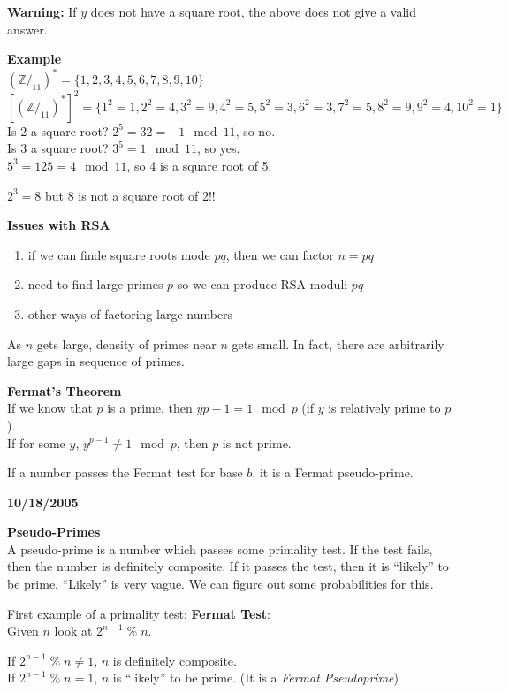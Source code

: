 \textbf{Warning:} If $y$ does not have a square root, the above does not give a valid answer.

\textbf{Example} \\
$(\mathbb{Z}/_{11})^* = \{1,2,3,4,5,6,7,8,9,10\}$\\
$[(\mathbb{Z}/_{11})^*]^2 = \{1^2 = 1,2^2 = 4,3^2 = 9,4^2 = 5,5^2 = 3,6^2 = 3,7^2 = 5,8^2 = 9,9^2 = 4,10^2 = 1\}$\\
Is 2 a square root? $2^5 = 32 = -1 \mod 11$, so no.\\
Is 3 a square root? $3^5 = 1 \mod 11$, so yes.\\
$5^3 = 125 = 4 \mod 11$, so 4 is a square root of 5.

$2^3 = 8$ but 8 is not a square root of 2!!

\textbf{Issues with RSA}
\begin{enumerate}
\item if we can finde square roots mode $pq$, then we can factor $n = pq$
\item need to find large primes $p$ so we can produce RSA moduli $pq$
\item other ways of factoring large numbers
\end{enumerate}

As $n$ gets large, density of primes near $n$ gets small. In fact, there are arbitrarily large gaps in sequence of primes.

\textbf{Fermat's Theorem}\\
If we know that $p$ is a prime, then $y{p-1} = 1 \mod p$ (if $y$ is relatively prime to $p$).\\
If for some $y$, $y^{p-1} \neq 1 \mod p$, then $p$ is not prime.

If a number passes the Fermat test for base $b$, it is a Fermat pseudo-prime.




\textbf{10/18/2005}

\textbf{Pseudo-Primes}\\
A pseudo-prime is a number which passes some primality test. If the test fails, then the number is definitely composite. If it passes the test, then it is ``likely'' to be prime. ``Likely'' is very vague. We can figure out some probabilities for this. 

First example of a primality test: \textbf{Fermat Test}:\\
Given $n$ look at $2^{n-1} \;\%\; n$.

If $2^{n-1} \;\%\; n \neq 1$, $n$ is definitely composite.\\
If $2^{n-1} \;\%\; n = 1$, $n$ is ``likely'' to be prime. (It is a \textit{Fermat Pseudoprime})

